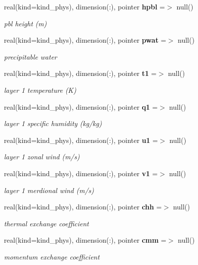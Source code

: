 \begin{DoxyCompactItemize}
real(kind=kind\+\_\+phys), dimension(\+:), pointer \textbf{ hpbl} =$>$ null()
\begin{DoxyCompactList}\small\item\em pbl height (m) \end{DoxyCompactList}\item 
real(kind=kind\+\_\+phys), dimension(\+:), pointer \textbf{ pwat} =$>$ null()
\begin{DoxyCompactList}\small\item\em precipitable water \end{DoxyCompactList}\item 
real(kind=kind\+\_\+phys), dimension(\+:), pointer \textbf{ t1} =$>$ null()
\begin{DoxyCompactList}\small\item\em layer 1 temperature (K) \end{DoxyCompactList}\item 
real(kind=kind\+\_\+phys), dimension(\+:), pointer \textbf{ q1} =$>$ null()
\begin{DoxyCompactList}\small\item\em layer 1 specific humidity (kg/kg) \end{DoxyCompactList}\item 
real(kind=kind\+\_\+phys), dimension(\+:), pointer \textbf{ u1} =$>$ null()
\begin{DoxyCompactList}\small\item\em layer 1 zonal wind (m/s) \end{DoxyCompactList}\item 
real(kind=kind\+\_\+phys), dimension(\+:), pointer \textbf{ v1} =$>$ null()
\begin{DoxyCompactList}\small\item\em layer 1 merdional wind (m/s) \end{DoxyCompactList}\item 
real(kind=kind\+\_\+phys), dimension(\+:), pointer \textbf{ chh} =$>$ null()
\begin{DoxyCompactList}\small\item\em thermal exchange coefficient \end{DoxyCompactList}\item 
real(kind=kind\+\_\+phys), dimension(\+:), pointer \textbf{ cmm} =$>$ null()
\begin{DoxyCompactList}\small\item\em momentum exchange coefficient \end{DoxyCompactList}\item 

\end{DoxyCompactItemize}
